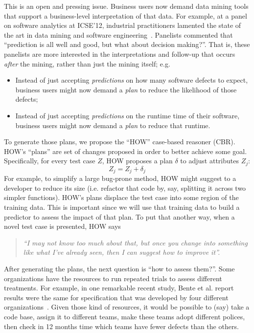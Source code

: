 \documentclass[conference]{IEEEtran}
\newcommand{\bi}{\begin{itemize}}
\newcommand{\ei}{\end{itemize}}
\begin{document}
This is an open and pressing issue.
Business  users   now demand   data mining tools
that  support a  business-level
interpretation of that data. For example,
at a  panel on software analytics at ICSE'12,
industrial practitioners lamented the state of the art in data mining
and software engineering~\cite{menzies12a}. Panelists commented that
``prediction is all well and good, but what about decision
making?''. That is, these panelists are more interested in the interpretations
and follow-up
that occurs {\em after} the mining, rather than just  the mining itself; e.g.
\bi
\item 
Instead of just accepting  {\em predictions} on how many 
 software defects
to expect,  business users might now demand a {\em plan} to
reduce the likelihood of those defects;
\item Instead of just accepting {\em predictions} on the runtime
time of their software, business users might now demand
a {\em plan} to reduce that runtime.
\ei
To generate those plans, we propose the ``HOW'' case-based reasoner (CBR).
HOW's  ``plans'' are  set of changes
proposed  in order to better achieve some goal. 
Specifically, for every test case $Z$, HOW proposes a  plan $\delta$ to
  adjust   attributes $Z_j$:
\[
Z_j = Z_j + \delta_j
\]
For example, to simplify a  large bug-prone  method, HOW might suggest
to a developer to reduce its size (i.e.  refactor that code by, say, splitting it across
two simpler functions).
HOW's  plans displace the test case into some region
of the training data. This is important since we will use that training data
to build a predictor to assess the impact of that plan.
To put that another way, when a novel test case is presented,
HOW says 
\begin{quote}{\em ``I may not know too much about that, but once you change into something like
what I've already seen, then I can suggest how to improve it''.}
\end{quote}
After generating the plans, the next question is ``how to assess them?''.  
Some organizations have the resources to 
run repeated trials to assess  different treatments.
For example, in one remarkable recent study, Bente et al. report results
were the same for specification that was developed  by four different organizations~\cite{Anda2009}. Given those kind of resources, it would be possible
to (say) take a code base, assign it to different teams, make these teams  adopt different polices,
then check in 12 months time
 which teams have fewer defects than the others.  
\end{document}
